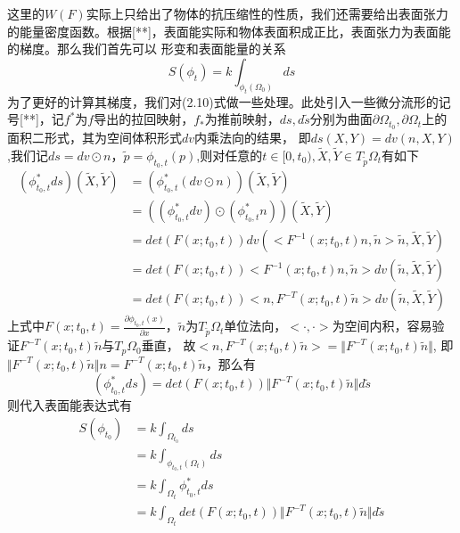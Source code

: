 这里的$W(F)$实际上只给出了物体的抗压缩性的性质，我们还需要给出表面张力的能量密度函数。根据[**]，表面能实际和物体表面积成正比，表面张力为表面能的梯度。那么我们首先可以
形变和表面能量的关系
\begin{equation}
    S(\phi_t) = k\int_{\phi_t (\Omega_0)} ds
\end{equation}
为了更好的计算其梯度，我们对(2.10)式做一些处理。此处引入一些微分流形的记号[**]，记$f^*$为$f$导出的拉回映射，$f_*$为推前映射，$ds,d\tilde{s}$分别为曲面$\partial \Omega_{t_0}, \partial \Omega_{t}$上的面积二形式，其为空间体积形式$dv$内乘法向的结果，
即$ds(X,Y) = dv(n,X,Y)$,我们记$ds = dv\odot n$，$ \tilde{p} = \phi_{t_0,t}(p)$,则对任意的$t \in[0, t_0),\tilde{X},\tilde{Y}\in T_{\tilde{p}}\Omega_t$有如下
\begin{equation}
    \begin{split}
        (\phi_{t_0,t}^*ds) (\tilde{X},\tilde{Y})& = (\phi_{t_0,t}^* (dv \odot n))(\tilde{X},\tilde{Y})\\
        &= ((\phi_{t_0,t}^* dv)\odot(\phi_{t_0,t}^* n))(\tilde{X},\tilde{Y})\\
        &= det(F(x;t_0,t))dv (<F^{-1}(x;t_0,t)n,\tilde{n}>\tilde{n} ,\tilde{X},\tilde{Y})\\
        &= det(F(x;t_0,t))<F^{-1}(x;t_0,t)n,\tilde{n}> dv(\tilde{n} ,\tilde{X},\tilde{Y})\\
        &= det(F(x;t_0,t))<n,F^{-T}(x;t_0,t)\tilde{n}>dv(\tilde{n} ,\tilde{X},\tilde{Y})
    \end{split}
\end{equation}
上式中$F(x;t_0,t) = \frac{\partial \phi_{t_0,t}(x)}{\partial x}$，$\tilde{n}$为$T_{\tilde{p}}\Omega_t$单位法向，$<\cdot,\cdot>$为空间内积，容易验证$F^{-T}(x;t_0,t)\tilde{n}$与$T_p\Omega_0$垂直，
故$<n,F^{-T}(x;t_0,t)\tilde{n}> = \Vert F^{-T}(x;t_0,t)\tilde{n}\Vert$, 即$\Vert F^{-T}(x;t_0,t)\tilde{n}\Vert n = F^{-T}(x;t_0,t)\tilde{n}$，那么有
$$(\phi_{t_0,t}^*ds) = det(F(x;t_0,t)) \Vert F^{-T}(x;t_0,t)\tilde{n}\Vert d\tilde{s}$$
则代入表面能表达式有
\begin{equation}
    \begin{split}
        S(\phi_{t_0}) &= k  \int_{\Omega_{t_0}}ds\\
        &= k \int_{\phi_{t_0,t}(\Omega_{t})} ds\\
        &= k \int_{\Omega_t}  \phi_{t_0,t}^* ds\\
        &= k \int_{\Omega_t} det(F(x;t_0,t)) \Vert F^{-T}(x;t_0,t)\tilde{n}\Vert d\tilde{s}\nonumber\\
    \end{split}
\end{equation}

